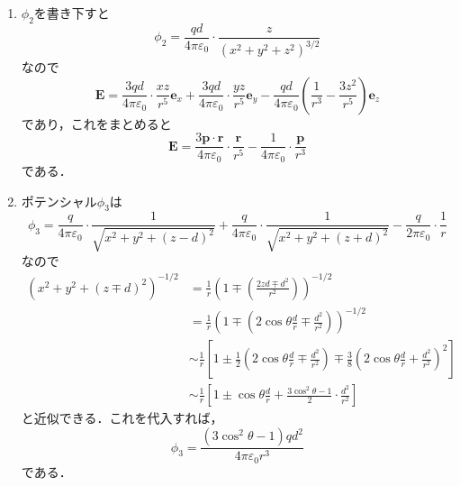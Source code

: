 \documentclass[a4paper,pdflatex,ja=standard]{bxjsarticle}
\begin{document}
\begin{enumerate}
  \item 
  $\phi_{2}$を書き下すと
  \begin{equation}
    \phi_{2}
    =
    \frac{qd}{4\pi\varepsilon_{0}}
    \cdot
    \frac{z}{(x^2+y^2+z^2)^{3/2}}
  \end{equation}
  なので
  \begin{equation}
    \bm{E}
    =
    \frac{3qd}{4\pi\varepsilon_{0}}\cdot\frac{xz}{r^5}\bm{e}_{x}
    +
    \frac{3qd}{4\pi\varepsilon_{0}}\cdot\frac{yz}{r^5}\bm{e}_{y}
    -
    \frac{qd}{4\pi\varepsilon_{0}}\left( \frac{1}{r^3}-\frac{3z^2}{r^5} \right)
    \bm{e}_{z}
  \end{equation}
  であり，これをまとめると
  \begin{equation}
    \bm{E}
    =
    \frac{3\bm{p}\cdot\bm{r}}{4\pi\varepsilon_{0}}\cdot\frac{\bm{r}}{r^5}
    -
    \frac{1}{4\pi\varepsilon_{0}}\cdot\frac{\bm{p}}{r^3}
  \end{equation}
  である．

  \item 
  ポテンシャル$\phi_{3}$は
  \begin{equation}
    \phi_{3}
    =
    \frac{q}{4\pi\varepsilon_{0}}\cdot\frac{1}{\sqrt{x^2+y^2+(z-d)^2}}
    +\frac{q}{4\pi\varepsilon_{0}}\cdot\frac{1}{\sqrt{x^2+y^2+(z+d)^2}}
    -
    \frac{q}{2\pi\varepsilon_{0}}\cdot\frac{1}{r}
  \end{equation}
  なので
  \begin{align}
    (x^2+y^2+(z\mp d)^2)^{-1/2}
    &=
    \frac{1}{r}\left( 1\mp\left( \frac{2zd\mp d^2}{r^2} \right) \right)^{-1/2}
    \nonumber
    \\
    &=
    \frac{1}{r}\left( 1\mp\left( 2\cos\theta\frac{d}{r}\mp\frac{d^2}{r^2} \right) \right)^{-1/2}
    \nonumber
    \\
    &\sim
    \frac{1}{r}
    \left[  
      1
      \pm
      \frac{1}{2}\left( 2\cos\theta\frac{d}{r}\mp\frac{d^2}{r^2} \right)
      \mp
      \frac{3}{8}
      \left( 2\cos\theta\frac{d}{r}+\frac{d^2}{r^2} \right)^2
    \right]
    \nonumber
    \\
    &\sim
    \frac{1}{r}
    \left[ 
      1
      \pm 
      \cos\theta \frac{d}{r}
      +
      \frac{3\cos^2\theta-1}{2}
      \cdot
      \frac{d^2}{r^2}
    \right]
    \label{approx}
  \end{align}
  と近似できる．これを代入すれば，
  \begin{equation}
    \phi_{3}
    =
    \frac{(3\cos^2\theta-1)qd^2}{4\pi\varepsilon_{0}r^3}
  \end{equation}
  である．


\end{enumerate}
\end{document}
